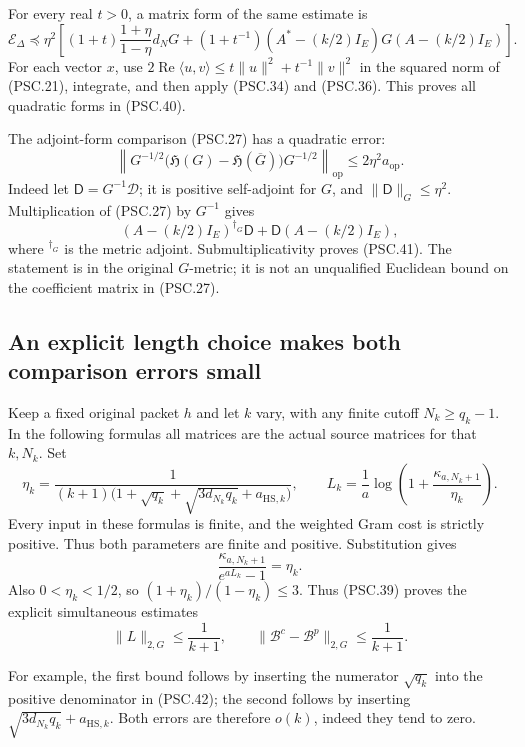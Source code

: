 For every real \(t>0\), a matrix form of the same estimate is
\[
 \mathscr E_\Delta
 \preceq\eta^2\left[
   (1+t)\frac{1+\eta}{1-\eta}d_NG
   +(1+t^{-1})(A^*-(k/2)I_E)G(A-(k/2)I_E)
 \right].
 \tag{PSC.40}
\]
For each vector \(x\), use
\(2\operatorname{Re}\langle u,v\rangle
\leq t\|u\|^2+t^{-1}\|v\|^2\)
in the squared norm of (PSC.21), integrate, and then apply (PSC.34) and (PSC.36). This proves all quadratic forms in (PSC.40).

The adjoint-form comparison (PSC.27) has a quadratic error:
\[
 \left\|
 G^{-1/2}\bigl(\mathfrak H(G)-\mathfrak H(\overline G)\bigr)
 G^{-1/2}
 \right\|_{\mathrm{op}}
 \leq2\eta^2a_{\mathrm{op}}.
 \tag{PSC.41}
\]
Indeed let \(\mathsf D=G^{-1}\mathscr D\); it is positive self-adjoint for \(G\), and \(\|\mathsf D\|_G\leq\eta^2\). Multiplication of (PSC.27) by \(G^{-1}\) gives
\[
 (A-(k/2)I_E)^{\dagger_G}\mathsf D
 +\mathsf D(A-(k/2)I_E),
 \]
where \({}^{\dagger_G}\) is the metric adjoint. Submultiplicativity proves (PSC.41). The statement is in the original \(G\)-metric; it is not an unqualified Euclidean bound on the coefficient matrix in (PSC.27).

\subsection{An explicit length choice makes both comparison errors small}

Keep a fixed original packet \(h\) and let \(k\) vary, with any finite cutoff \(N_k\geq q_k-1\). In the following formulas all matrices are the actual source matrices for that \(k,N_k\). Set
\[
 \eta_k=
 \frac{1}
 {(k+1)\bigl(1+\sqrt{q_k}
       +\sqrt{3d_{N_k}q_k}+a_{\mathrm{HS},k}\bigr)},
 \qquad
 L_k=\frac1a\log\left(1+\frac{\kappa_{a,N_k+1}}{\eta_k}\right).
 \tag{PSC.42}
\]
Every input in these formulas is finite, and the weighted Gram cost is strictly positive. Thus both parameters are finite and positive. Substitution gives
\[
 \frac{\kappa_{a,N_k+1}}{e^{aL_k}-1}=\eta_k.
 \]
Also \(0<\eta_k<1/2\), so
\((1+\eta_k)/(1-\eta_k)\leq3\).
Thus (PSC.39) proves the explicit simultaneous estimates
\[
 \boxed{
 \|L\|_{2,G}\leq\frac1{k+1},\qquad
 \|\mathscr B^c-\mathscr B^p\|_{2,G}
          \leq\frac1{k+1}.}
 \tag{PSC.43}
\]

For example, the first bound follows by inserting the numerator
\(\sqrt{q_k}\) into the positive denominator in (PSC.42); the second follows by inserting
\(\sqrt{3d_{N_k}q_k}+a_{\mathrm{HS},k}\).
Both errors are therefore \(o(k)\), indeed they tend to zero.

